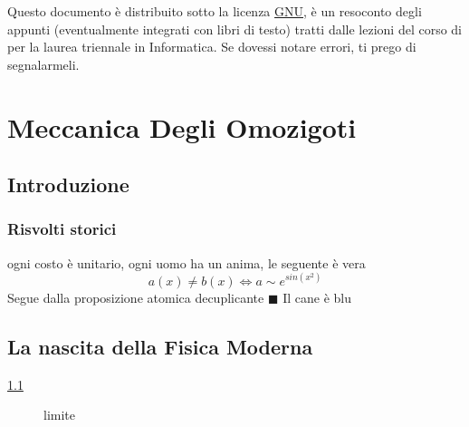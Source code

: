 \documentclass[10pt, letterpaper]{report}
\begin{document}
\newpage
\pagecolor{cartaRiciclata}%
\Large
Questo documento è distribuito sotto la licenza 
\color{blue}\href{https://www.gnu.org/licenses/fdl-1.3.txt}{GNU}\color{black},  
è un resoconto degli appunti (eventualmente integrati con libri di testo) tratti dalle lezioni del corso di \jobname
\hphantom{a}per la laurea 
triennale in Informatica. Se dovessi notare errori, ti prego di segnalarmeli.
\newpage %
\normalsize
\tableofcontents 
\newpage

\fancyhf{}
\fancyhead[L]{\nouppercase{\leftmark}}
\fancyfoot[C]{\thepage}






\chapter{Meccanica Degli Omozigoti}
\section{Introduzione}
\lipsum[1]
\subsection{Risvolti storici}
\lipsum[2]\acc 
{}ogni costo è unitario, ogni uomo ha un anima, le seguente è vera
$$ a(x)\ne b(x)\iff a\sim e^{sin(x^2)}$$
\dimo{}Segue dalla proposizione atomica decuplicante $\blacksquare$\acc \lipsum[2]\acc
\prop{}Il cane è blu \flowerLine 
\section{La nascita della Fisica Moderna}
\lipsum[1] \ref{fig:birds} \lipsum[2]
\begin{figure}[h!]
    \centering
    \caption{limite}
    \label{fig:birds}
\end{figure}\acc
\lipsum[3]
\end{document}
